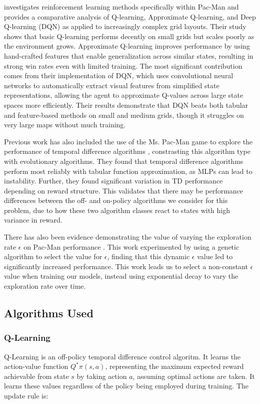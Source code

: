 \documentclass{article}
\begin{document}
\citet{gnanasekaran} investigates reinforcement learning methods specifically within Pac-Man and provides a comparative analysis of Q-learning, Approximate Q-learning, and Deep Q-learning (DQN) as applied to increasingly complex grid layouts. Their study shows that basic Q-learning performs decently on small grids but scales poorly as the environment grows. Approximate Q-learning improves performance by using hand-crafted features that enable generalization across similar states, resulting in strong win rates even with limited training. The most significant contribution comes from their implementation of DQN, which uses convolutional neural networks to automatically extract visual features from simplified state representations, allowing the agent to approximate Q-values across large state spaces more efficiently. Their results demonstrate that DQN beats both tabular and feature-based methods on small and medium grids, though it struggles on very large maps without much training. 

Previous work has also included the use of the Ms. Pac-Man game to explore the performance of temporal difference algorithms \citep{burrow}, constrasting this algorithm type with evolutionary algorithms. They found that temporal difference algorithms perform most reliably with tabular function approximation, as MLPs can lead to instability. Further, they found significant variation in TD performance depending on reward structure. This validates that there may be performance differences between the off- and on-policy algorithms we consider for this problem, due to how these two algorithm classes react to states with high variance in reward. 

There has also been evidence demonstrating the value of varying the exploration rate $\epsilon$ on Pac-Man performance \citep{galway}. This work experimented by using a genetic algorithm to select the value for $\epsilon$, finding that this dynamic $\epsilon$ value led to significantly increased performance. This work leads us to select a non-constant $\epsilon$ value when training our models, instead using exponential decay to vary the exploration rate over time. 

\subsection{Algorithms Used}

\subsubsection{Q-Learning} Q-Learning is an off-policy temporal difference control algoritm. It learns the action-value function $Q^*\pi(s,a)$, representing the maximum expected reward achievable from state $s$ by taking action $a$, assuming optimal actions are taken. It learns these values regardless of the policy being employed during training. The update rule is:
\end{document}
